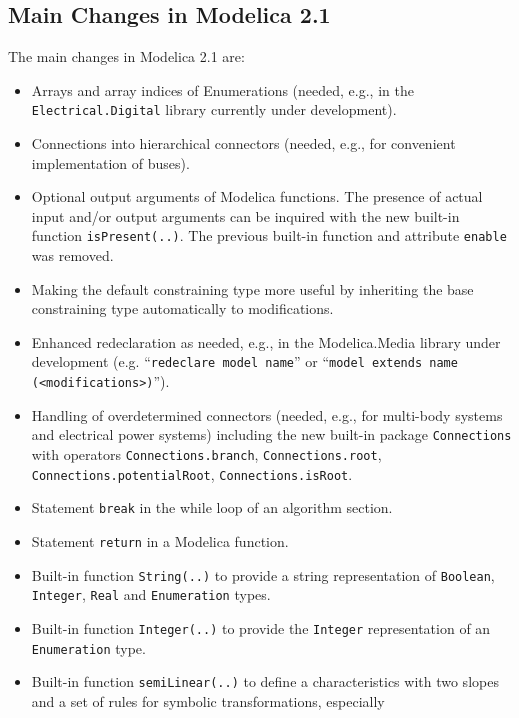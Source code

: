 \subsection{Main Changes in Modelica 2.1}

The main changes in Modelica 2.1 are:

\begin{itemize}
\item
  Arrays and array indices of Enumerations (needed, e.g., in the
  \lstinline!Electrical.Digital! library currently under development).
\item
  Connections into hierarchical connectors (needed, e.g., for convenient
  implementation of buses).
\item
  Optional output arguments of Modelica functions. The presence of
  actual input and/or output arguments can be inquired with the new
  built-in function \lstinline!isPresent(..)!. The previous built-in function and
  attribute \lstinline!enable! was removed.
\item
  Making the default constraining type more useful by inheriting the
  base constraining type automatically to modifications.
\item
  Enhanced redeclaration as needed, e.g., in the Modelica.Media library
  under development (e.g. ``\lstinline!redeclare model name!'' or ``\lstinline!model extends name (<modifications>)!'').
\item
  Handling of overdetermined connectors (needed, e.g., for multi-body
  systems and electrical power systems) including the new built-in
  package \lstinline!Connections! with operators \lstinline!Connections.branch!,
  \lstinline!Connections.root!, \lstinline!Connections.potentialRoot!, \lstinline!Connections.isRoot!.
\item
  Statement \lstinline!break! in the while loop of an algorithm section.
\item
  Statement \lstinline!return! in a Modelica function.
\item
  Built-in function \lstinline!String(..)! to provide a string representation of
  \lstinline!Boolean!, \lstinline!Integer!, \lstinline!Real! and \lstinline!Enumeration! types.
\item
  Built-in function \lstinline!Integer(..)! to provide the \lstinline!Integer! representation of
  an \lstinline!Enumeration! type.
\item
  Built-in function \lstinline!semiLinear(..)! to define a characteristics with two
  slopes and a set of rules for symbolic transformations, especially

\end{itemize}
